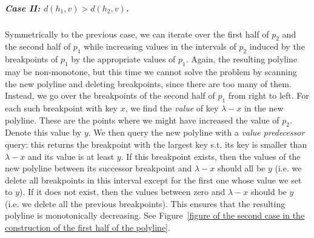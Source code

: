 \documentclass[a4paper,UKenglish]{lipics-v2016}
\theoremstyle{plain}
\renewcommand{\paragraph}{\subparagraph}
\begin{document}
\paragraph{Case II: \boldmath$d(h_1,v) > d(h_2,v)$.}
Symmetrically to the previous case, we can iterate over the first half of $p_2$ and the second half of $p_1$ while increasing values in the intervals of $p_2$ induced by the breakpoints of $p_1$ by the appropriate values of $p_{1}$. Again, the resulting polyline may be non-monotone, but this time we cannot solve the problem by scanning the new polyline and deleting breakpoints, since there are too many of them. Instead, we go over the breakpoints of the second half of $p_1$ from right to left. For each such breakpoint  with key $x$, we find the {\em value} of key $\lambda - x$ in the new polyline. These are the points where we might have increased the value of $p_2$. Denote this value by $y$. We then query the new polyline with a \emph{value predecessor} query: this returns the breakpoint   with the largest key s.t. its key is smaller than $\lambda - x$ and its value is at least $y$. 
%
If this breakpoint exists, then the values of the new polyline between its successor breakpoint and $\lambda - x$ should all be $y$ (i.e. we delete all breakpoints in this interval except for the first one whose value we set to $y$). %
If it does not exist, then the values between zero and $\lambda - x$ should be $y$ (i.e. we delete all the previous breakpoints). 
This ensures that the resulting polyline is monotonically decreasing. 
See  Figure~\ref{figure of the second case in the construction of the first half of the polyline}.
\end{document}
